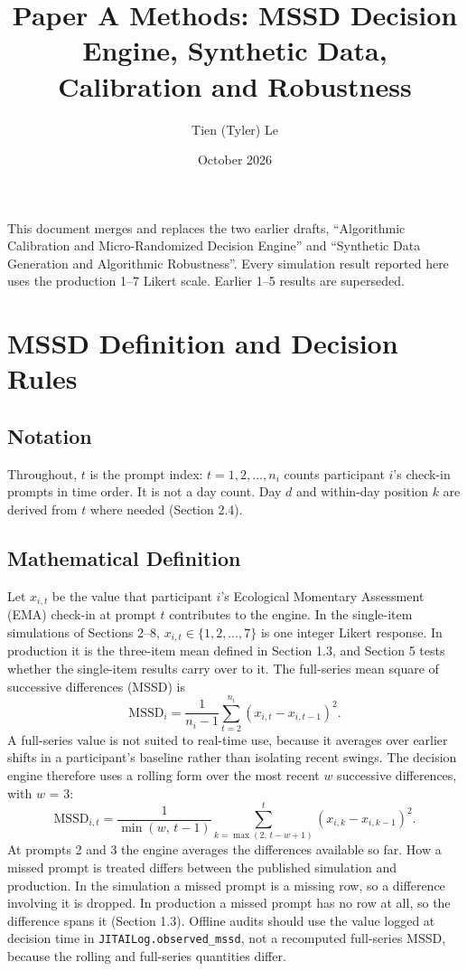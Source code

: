 \documentclass[11pt,letterpaper]{article}
\title{\textbf{Paper A Methods: MSSD Decision Engine, Synthetic Data, Calibration and Robustness}}
\author{Tien (Tyler) Le}
\date{October 2026}
\begin{document}
\maketitle

\noindent This document merges and replaces the two earlier drafts, ``Algorithmic Calibration and Micro-Randomized Decision Engine'' and ``Synthetic Data Generation and Algorithmic Robustness''. Every simulation result reported here uses the production 1--7 Likert scale. Earlier 1--5 results are superseded.

\section{MSSD Definition and Decision Rules}

\subsection{Notation}

Throughout, $t$ is the prompt index: $t = 1, 2, \dots, n_i$ counts participant $i$'s check-in prompts in time order. It is not a day count. Day $d$ and within-day position $k$ are derived from $t$ where needed (Section 2.4).

\subsection{Mathematical Definition}

Let $x_{i,t}$ be the value that participant $i$'s Ecological Momentary Assessment (EMA) check-in at prompt $t$ contributes to the engine. In the single-item simulations of Sections 2--8, $x_{i,t} \in \{1, 2, \dots, 7\}$ is one integer Likert response. In production it is the three-item mean defined in Section 1.3, and Section 5 tests whether the single-item results carry over to it. The full-series mean square of successive differences (MSSD) is
\begin{equation}
\text{MSSD}_i = \frac{1}{n_i - 1} \sum_{t=2}^{n_i} (x_{i,t} - x_{i,t-1})^2 .
\end{equation}
A full-series value is not suited to real-time use, because it averages over earlier shifts in a participant's baseline rather than isolating recent swings. The decision engine therefore uses a rolling form over the most recent $w$ successive differences, with $w$ = 3:
\begin{equation}
\widehat{\text{MSSD}}_{i,t} = \frac{1}{\min(w,\, t - 1)} \sum_{k=\max(2,\, t - w + 1)}^{t} (x_{i,k} - x_{i,k-1})^2 .
\end{equation}
At prompts 2 and 3 the engine averages the differences available so far. How a missed prompt is treated differs between the published simulation and production. In the simulation a missed prompt is a missing row, so a difference involving it is dropped. In production a missed prompt has no row at all, so the difference spans it (Section 1.3). Offline audits should use the value logged at decision time in \texttt{JITAILog.observed\_mssd}, not a recomputed full-series MSSD, because the rolling and full-series quantities differ.
\end{document}
